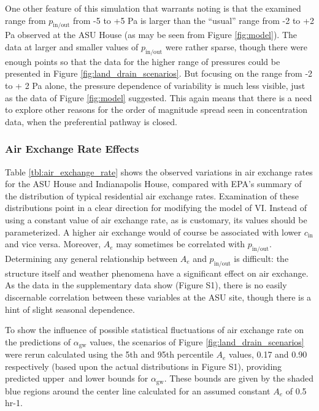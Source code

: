 \documentclass[journal=esthag,manuscript=article]{achemso}
\begin{document}
One other feature of this simulation that warrants noting is that the examined range from $p_\mathrm{in/out}$ from -5 to +5 Pa is larger than the “usual” range from -2 to +2 Pa observed at the ASU House (as may be seen from Figure \ref{fig:model}).
The data at larger and smaller values of $p_\mathrm{in/out}$ were rather sparse, though there were enough points so that the data for the higher range of pressures could be presented in Figure \ref{fig:land_drain_scenarios}.
But focusing on the range from -2 to + 2 Pa alone, the pressure dependence of variability is much less visible, just as the data of Figure \ref{fig:model} suggested.
This again means that there is a need to explore other reasons for the order of magnitude spread seen in concentration data, when the preferential pathway is closed.

\subsubsection{Air Exchange Rate Effects}

Table \ref{tbl:air_exchange_rate} shows the observed variations in air exchange rates for the ASU House and Indianapolis House, compared with EPA’s summary of the distribution of typical residential air exchange rates\cite{u.s._epa_exposure_2011,m._d._koontz_estimation_1995}.
Examination of these distributions point in a clear direction for modifying the model of VI.
Instead of using a constant value of air exchange rate, as is customary, its values should be parameterized.
A higher air exchange would of course be associated with lower $c_\mathrm{in}$ and vice versa.
Moreover, $A_e$ may sometimes be correlated with $p_\mathrm{in/out}$. Determining any general relationship between $A_e$ and $p_\mathrm{in/out}$ is difficult: the structure itself and weather phenomena have a significant effect on air exchange.
As the data in the supplementary data show (Figure S1), there is no easily discernable correlation between these variables at the ASU site, though there is a hint of slight seasonal dependence.

To show the influence of possible statistical fluctuations of air exchange rate on the predictions of $\alpha_\mathrm{gw}$ values, the scenarios of Figure \ref{fig:land_drain_scenarios} were rerun calculated using the 5th and 95th percentile $A_e$ values, 0.17 and 0.90 respectively (based upon the actual distributions in Figure S1), providing predicted upper and lower bounds for $\alpha_\mathrm{gw}$.
These bounds are given by the shaded blue regions around the center line calculated for an assumed constant $A_e$ of 0.5 hr-1.
\end{document}
